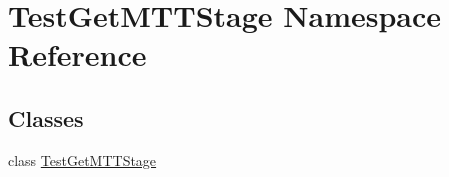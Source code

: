 \hypertarget{namespace_test_get_m_t_t_stage}{\section{Test\-Get\-M\-T\-T\-Stage Namespace Reference}
\label{namespace_test_get_m_t_t_stage}
}
\subsection*{Classes}
\begin{DoxyCompactItemize}
\item 
class \hyperlink{class_test_get_m_t_t_stage_1_1_test_get_m_t_t_stage}{Test\-Get\-M\-T\-T\-Stage}
\end{DoxyCompactItemize}
